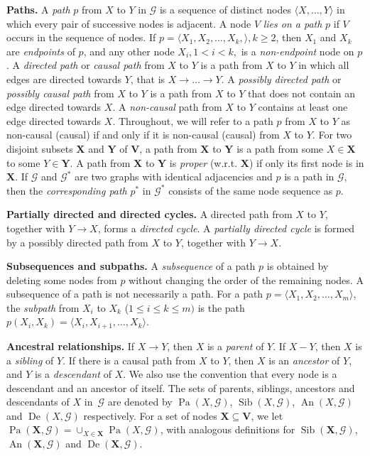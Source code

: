 \documentclass[letterpaper]{article}
\theoremstyle{definition}
\theoremstyle{remark}
\DeclareMathOperator{\Sib}{Sib}
\DeclareMathOperator{\De}{De}
\DeclareMathOperator{\An}{An}
\DeclareMathOperator{\Pa}{Pa}
\newcommand{\g}[1][G]{\mathcal{#1}}
\newcommand{\pstar}[1][p]{{#1}^{*}}
\begin{document}
\textbf{Paths.} A \textit{path} $p$ from $X$ to $Y$ in $\g$ is a sequence of distinct nodes $\langle X, \dots,Y \rangle$ in which every pair of successive nodes is adjacent. A node $V$ \emph{lies on a path} $p$ if $V$ occurs in the sequence of nodes. If $p = \langle X_1, X_2, \dots , X_k, \rangle, k \ge 2$, then $X_1$ and $X_k$ are \textit{endpoints} of $p$, and any other node $X_i, 1 <i<k,$ is a \textit{non-endpoint} node on $p$. A \textit{directed path} or \textit{causal path} from $X$ to $Y$ is a path from $X$ to $Y$ in which all edges are directed towards $Y$, that is $X \to \dots\to Y$. A \textit{possibly directed path} or \textit{possibly causal path} from $X$ to $Y$ is a path from $X$ to $Y$ that does not contain an edge directed towards $X$. A \textit{non-causal} path from $X$ to $Y$ contains at least one edge directed towards $X$. Throughout, we will refer to a path $p$ from $X$ to $Y$ as non-causal (causal) if and only if it is non-causal (causal) from $X$ to $Y$.
For two disjoint subsets $\mathbf{X}$ and $\mathbf{Y}$ of $\mathbf{V}$, a path from $\mathbf{X}$ to $\mathbf{Y}$
is a path from some $X \in \mathbf{X}$ to some $Y \in \mathbf{Y}$.
A path from $\mathbf{X}$ to $\mathbf{Y}$ is \textit{proper} (w.r.t. $\mathbf{X}$) if only its first node is in $\mathbf{X}$. If $\g$ and $\g^*$ are two graphs with identical adjacencies and $p$ is a path in $\g$, then the \textit{corresponding path} $\pstar$ in $\g^*$ consists of the same node sequence as $p$.

\textbf{Partially directed and directed cycles.}
A directed path from $X$ to $Y$, together with $Y\to X$, forms a \textit{directed cycle}.
A \textit{partially directed cycle} is formed by a possibly directed path from $X$ to $Y$, together with $Y \to X$. 

\textbf{Subsequences and subpaths.} A \textit{subsequence} of a path $p$ is obtained by deleting some nodes from $p$ without changing the order of the remaining nodes. A subsequence of a path is not necessarily a path. For a path $p = \langle X_1,X_2,\dots,X_m \rangle$, the \textit{subpath} from $X_i$ to $X_k$ ($1\le i\le k\le m)$ is the path $p(X_i,X_k) = \langle X_i,X_{i+1},\dots,X_{k}\rangle$.

\textbf{Ancestral relationships.} If $X\to Y$, then $X$ is a \textit{parent} of $Y$. If $X - Y$, then $X$ is a \textit{sibling} of $Y$. If there is a causal path from $X$ to $Y$, then $X$ is an \textit{ancestor} of $Y$, and $Y$ is a \textit{descendant} of $X$. We also use the convention that every node is a descendant and an ancestor of itself.
The sets of parents, siblings, ancestors and descendants of $X$ in~$\g$ are denoted by $\Pa(X,\g)$, $\Sib(X,\g)$, $\An(X,\g)$ and $\De(X,\g)$ respectively. For a set of nodes $\mathbf{X} \subseteq \mathbf{V}$, we let $\Pa(\mathbf{X},\g) = \cup_{X \in \mathbf{X}} \Pa(X,\g)$, with analogous definitions for $\Sib(\mathbf{X},\g)$, $\An(\mathbf{X},\g)$ and $\De(\mathbf{X},\g)$.
\end{document}

